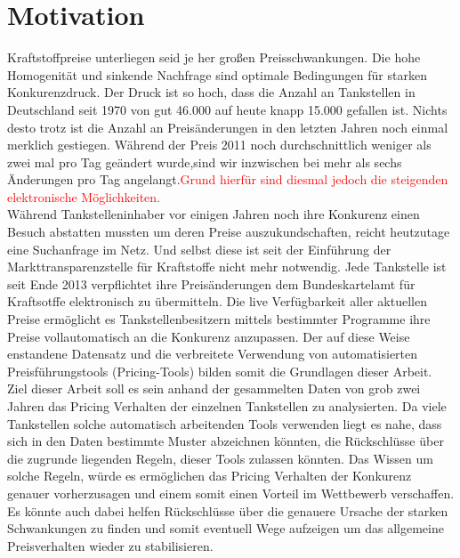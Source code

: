 \documentclass[12pt,a4paper,bibliography=totocnumbered,listof=totocnumbered]{scrartcl}
\begin{document}
\setcounter{page}{1}
\onehalfspacing
{}
\section{Motivation}
Kraftstoffpreise unterliegen seid je her großen Preisschwankungen. Die hohe Homogenität und sinkende Nachfrage sind optimale Bedingungen für starken Konkurenzdruck. Der Druck ist so hoch, dass die Anzahl an Tankstellen in Deutschland seit 1970 von gut 46.000 auf heute knapp 15.000 gefallen ist.\cite{PraTa} Nichts desto trotz ist die Anzahl an Preisänderungen in den letzten Jahren noch einmal merklich gestiegen. Während der Preis 2011 noch durchschnittlich weniger als zwei mal pro Tag geändert wurde,sind wir inzwischen bei mehr als sechs Änderungen pro Tag angelangt.\cite{Unity}\textcolor{red}{Grund hierfür sind diesmal jedoch die steigenden elektronische Möglichkeiten.}\\

Während Tankstelleninhaber vor einigen Jahren noch ihre Konkurenz einen Besuch abstatten mussten um deren Preise auszukundschaften, reicht heutzutage eine Suchanfrage im Netz. Und selbst diese ist seit der Einführung der Markttransparenzstelle für Kraftstoffe nicht mehr notwendig. Jede Tankstelle ist seit Ende 2013 verpflichtet ihre Preisänderungen dem Bundeskartelamt für Kraftsotffe elektronisch zu übermitteln. Die live Verfügbarkeit aller aktuellen Preise ermöglicht es Tankstellenbesitzern mittels bestimmter Programme ihre Preise vollautomatisch an die Konkurenz anzupassen. Der auf diese Weise enstandene Datensatz und die verbreitete Verwendung von automatisierten Preisführungstools (Pricing-Tools) bilden somit die Grundlagen dieser Arbeit.\\

Ziel dieser Arbeit soll es sein anhand der gesammelten Daten von grob zwei Jahren das Pricing Verhalten der einzelnen Tankstellen zu analysierten. Da  viele Tankstellen solche automatisch arbeitenden Tools verwenden liegt es nahe, dass sich in den Daten bestimmte Muster abzeichnen könnten, die Rückschlüsse über die zugrunde liegenden Regeln, dieser Tools zulassen könnten. Das Wissen um solche Regeln, würde es ermöglichen das Pricing Verhalten der Konkurenz genauer vorherzusagen und einem somit einen Vorteil im Wettbewerb verschaffen. Es könnte auch dabei helfen Rückschlüsse über die genauere Ursache der starken Schwankungen zu finden und somit eventuell Wege  aufzeigen um das allgemeine Preisverhalten wieder zu stabilisieren. 
\newpage
\vspace{-1,2em}
\end{document}
